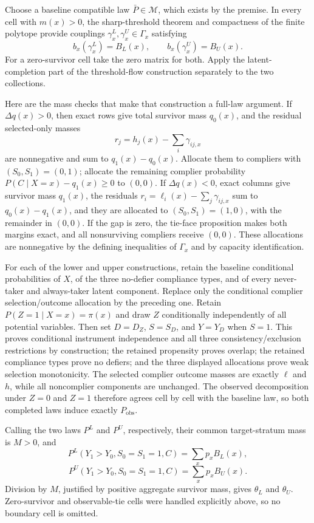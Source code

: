 Choose a baseline compatible law \(\bar P\in\mathcal M\), which exists by the premise.  In every cell with \(m(x)>0\), the sharp-threshold theorem and compactness of the finite polytope provide couplings \(\gamma_x^L,\gamma_x^U\in\Gamma_x\) satisfying
\[
b_x(\gamma_x^L)=B_L(x),\qquad b_x(\gamma_x^U)=B_U(x).
\]
For a zero-survivor cell take the zero matrix for both.  Apply the latent-completion part of the threshold-flow construction separately to the two collections.

Here are the mass checks that make that construction a full-law argument.  If \(\Delta q(x)>0\), then exact rows give total survivor mass \(q_0(x)\), and the residual selected-only masses
\[
r_j=h_j(x)-\sum_i\gamma_{ij,x}
\]
are nonnegative and sum to \(q_1(x)-q_0(x)\).  Allocate them to compliers with \((S_0,S_1)=(0,1)\); allocate the remaining complier probability \(P(C\mid X=x)-q_1(x)\ge0\) to \((0,0)\).  If \(\Delta q(x)<0\), exact columns give survivor mass \(q_1(x)\), the residuals \(r_i=\ell_i(x)-\sum_j\gamma_{ij,x}\) sum to \(q_0(x)-q_1(x)\), and they are allocated to \((S_0,S_1)=(1,0)\), with the remainder in \((0,0)\).  If the gap is zero, the tie-face proposition makes both margins exact, and all nonsurviving compliers receive \((0,0)\).  These allocations are nonnegative by the defining inequalities of \(\Gamma_x\) and by capacity identification.

For each of the lower and upper constructions, retain the baseline conditional probabilities of \(X\), of the three no-defier compliance types, and of every never-taker and always-taker latent component.  Replace only the conditional complier selection/outcome allocation by the preceding one.  Retain \(P(Z=1\mid X=x)=\pi(x)\) and draw \(Z\) conditionally independently of all potential variables.  Then set \(D=D_Z\), \(S=S_D\), and \(Y=Y_D\) when \(S=1\).  This proves conditional instrument independence and all three consistency/exclusion restrictions by construction; the retained propensity proves overlap; the retained compliance types prove no defiers; and the three displayed allocations prove weak selection monotonicity.  The selected complier outcome masses are exactly \(\ell\) and \(h\), while all noncomplier components are unchanged.  The observed decomposition under \(Z=0\) and \(Z=1\) therefore agrees cell by cell with the baseline law, so both completed laws induce exactly \(P_{\mathrm{obs}}\).

Calling the two laws \(P^L\) and \(P^U\), respectively, their common target-stratum mass is \(M>0\), and
\[
P^L(Y_1>Y_0,S_0=S_1=1,C)=\sum_xp_xB_L(x),
\]
\[
P^U(Y_1>Y_0,S_0=S_1=1,C)=\sum_xp_xB_U(x).
\]
Division by \(M\), justified by positive aggregate survivor mass, gives \(\theta_L\) and \(\theta_U\).  Zero-survivor and observable-tie cells were handled explicitly above, so no boundary cell is omitted.